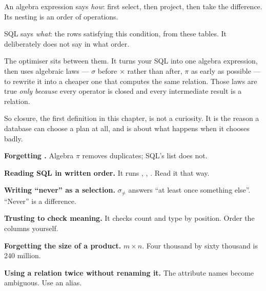 \begin{conceptbox}
An algebra expression says \emph{how}: first select, then project, then take
the difference. Its nesting is an order of operations.

\smallskip
SQL says \emph{what}: the rows satisfying this condition, from these tables.
It deliberately does not say in what order.

\smallskip
The optimiser sits between them. It turns your SQL into one algebra
expression, then uses algebraic laws --- $\sigma$ before $\times$ rather than
after, $\pi$ as early as possible --- to rewrite it into a cheaper one that
computes the same relation. Those laws are true \emph{only because} every
operator is closed and every intermediate result is a relation.

\smallskip
So closure, the first definition in this chapter, is not a curiosity. It is
the reason a database can choose a plan at all, and  is about
what happens when it chooses badly.
\end{conceptbox}

\begin{pitfall}
\begin{tight}
  \item \textbf{Forgetting .} Algebra $\pi$ removes
        duplicates; SQL's  list does not.
  \item \textbf{Reading SQL in written order.} It runs ,
        , . Read it that way.
  \item \textbf{Writing ``never'' as a selection.} $\sigma_{\neq}$ answers
        ``at least once something else''. ``Never'' is a difference.
  \item \textbf{Trusting  to check meaning.} It checks count and
        type by position. Order the columns yourself.
  \item \textbf{Forgetting the size of a product.} $m \times n$. Four thousand
        by sixty thousand is 240 million.
  \item \textbf{Using a relation twice without renaming it.} The attribute
        names become ambiguous. Use an alias.
\end{tight}
\end{pitfall}

